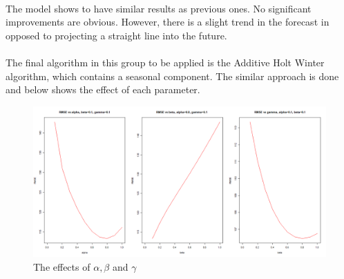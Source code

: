 \documentclass[12pt]{article}
\begin{document}
\paragraph{}
The model shows to have similar results as previous ones. No significant improvements are obvious. However, there is a slight trend in the forecast in opposed to projecting a straight line into the future.

\paragraph{}
The final algorithm in this group to be applied is the Additive Holt Winter algorithm, which contains a seasonal component. The similar approach is done and below shows the effect of each parameter.
\begin{figure}[H]
  \centering
  \includegraphics[width=\linewidth]{figure22.png}
  \caption{The effects of $\alpha, \beta$ and $\gamma$}
  \label{fig:figure22}
\end{figure}
\end{document}
